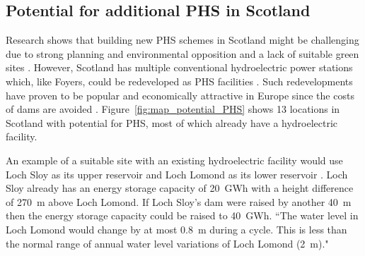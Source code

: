 \begin{comment}
``As a pumped storage system it generates 300Mw from two 150Mw machines. During the day the machines are kept on spinning reserve ready to meet periods of peak demand, the response time is in the order of 15 seconds. Spinning reserve requires the machines to rotate in synchronisation with the National Grid frequency. Power to keep the machines in this state of readiness, is drawn from the 5Mw adjacent hydro station.

``The cost of the power absorbed in maintaining spinning reserve is paid for by the utility requiring peak load electricity, this spinning reserve power is charged at a premium rate above normal grid prices. Peak load electricity can command prices in the thousands of pounds per Mw/hr all be it for short bursts of power at any given time. On average a pumped storage scheme may well have in excess of ten thousand stop -starts in a year.

``[\ldots]The investment in Foyers described above suggests that it may be both feasible and profitable to upgrade and refurbish other existing hydro schemes."
\url{http://www.esru.strath.ac.uk/EandE/Web_sites/03-04/wind/content/storage%20available.html}
\end{comment}




\subsection{Potential for additional PHS in Scotland}

Research shows that building new PHS schemes in Scotland might be challenging due to strong planning and environmental opposition and a lack of suitable green sites \citep{Strathclyde2004, ScotsRenewables2011}.
However, Scotland has multiple conventional hydroelectric power stations which, like Foyers, could be redeveloped as PHS facilities \citep{Strathclyde2004, MacKayDavid2009}.
Such redevelopments have proven to be popular and economically attractive in Europe since the costs of dams are avoided \citep{ESMStudy2010}.
Figure~\ref{fig:map_potential_PHS} shows 13 locations in Scotland with potential for PHS, most of which already have a hydroelectric facility.



An example of a suitable site with an existing hydroelectric facility would use Loch Sloy as its upper reservoir and Loch Lomond as its lower reservoir \citep{MacKayDavid2009, Strathclyde2004}.
Loch Sloy already has an energy storage capacity of 20~GWh with a height difference of 270~m above Loch Lomond.
If Loch Sloy's dam were raised by another 40~m then the energy storage capacity could be raised to 40~GWh.
``The water level in Loch Lomond would change by at most 0.8~m during a cycle.
This is less than the normal range of annual water level variations of Loch Lomond (2~m)." \citep[p.~193]{MacKayDavid2009}

